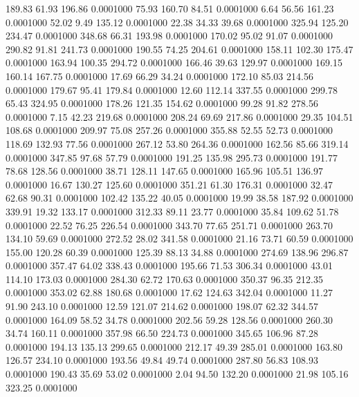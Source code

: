  189.83   61.93  196.86   0.0001000
  75.93  160.70   84.51   0.0001000
   6.64   56.56  161.23   0.0001000
  52.02    9.49  135.12   0.0001000
  22.38   34.33   39.68   0.0001000
 325.94  125.20  234.47   0.0001000
 348.68   66.31  193.98   0.0001000
 170.02   95.02   91.07   0.0001000
 290.82   91.81  241.73   0.0001000
 190.55   74.25  204.61   0.0001000
 158.11  102.30  175.47   0.0001000
 163.94  100.35  294.72   0.0001000
 166.46   39.63  129.97   0.0001000
 169.15  160.14  167.75   0.0001000
  17.69   66.29   34.24   0.0001000
 172.10   85.03  214.56   0.0001000
 179.67   95.41  179.84   0.0001000
  12.60  112.14  337.55   0.0001000
 299.78   65.43  324.95   0.0001000
 178.26  121.35  154.62   0.0001000
  99.28   91.82  278.56   0.0001000
   7.15   42.23  219.68   0.0001000
 208.24   69.69  217.86   0.0001000
  29.35  104.51  108.68   0.0001000
 209.97   75.08  257.26   0.0001000
 355.88   52.55   52.73   0.0001000
 118.69  132.93   77.56   0.0001000
 267.12   53.80  264.36   0.0001000
 162.56   85.66  319.14   0.0001000
 347.85   97.68   57.79   0.0001000
 191.25  135.98  295.73   0.0001000
 191.77   78.68  128.56   0.0001000
  38.71  128.11  147.65   0.0001000
 165.96  105.51  136.97   0.0001000
  16.67  130.27  125.60   0.0001000
 351.21   61.30  176.31   0.0001000
  32.47   62.68   90.31   0.0001000
 102.42  135.22   40.05   0.0001000
  19.99   38.58  187.92   0.0001000
 339.91   19.32  133.17   0.0001000
 312.33   89.11   23.77   0.0001000
  35.84  109.62   51.78   0.0001000
  22.52   76.25  226.54   0.0001000
 343.70   77.65  251.71   0.0001000
 263.70  134.10   59.69   0.0001000
 272.52   28.02  341.58   0.0001000
  21.16   73.71   60.59   0.0001000
 155.00  120.28   60.39   0.0001000
 125.39   88.13   34.88   0.0001000
 274.69  138.96  296.87   0.0001000
 357.47   64.02  338.43   0.0001000
 195.66   71.53  306.34   0.0001000
  43.01  114.10  173.03   0.0001000
 284.30   62.72  170.63   0.0001000
 350.37   96.35  212.35   0.0001000
 353.02   62.88  180.68   0.0001000
  17.62  124.63  342.04   0.0001000
  11.27   91.90  243.10   0.0001000
  12.59  121.07  214.62   0.0001000
 198.07   62.32  344.57   0.0001000
 164.09   58.52   34.78   0.0001000
 202.56   59.28  128.56   0.0001000
 260.30   34.74  160.11   0.0001000
 357.98   66.50  224.73   0.0001000
 345.65  106.96   87.28   0.0001000
 194.13  135.13  299.65   0.0001000
 212.17   49.39  285.01   0.0001000
 163.80  126.57  234.10   0.0001000
 193.56   49.84   49.74   0.0001000
 287.80   56.83  108.93   0.0001000
 190.43   35.69   53.02   0.0001000
   2.04   94.50  132.20   0.0001000
  21.98  105.16  323.25   0.0001000
